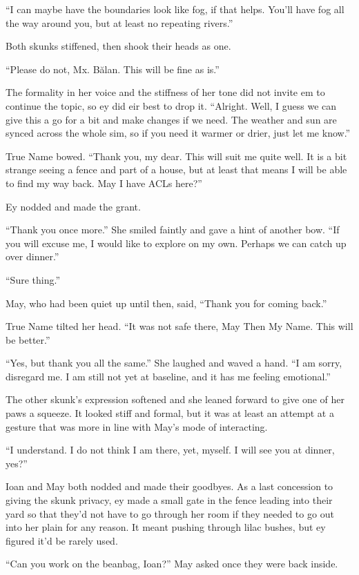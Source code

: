 ``I can maybe have the boundaries look like fog, if that helps. You'll have fog all the way around you, but at least no repeating rivers.''

Both skunks stiffened, then shook their heads as one.

``Please do not, Mx. Bălan. This will be fine as is.''

The formality in her voice and the stiffness of her tone did not invite em to continue the topic, so ey did eir best to drop it. ``Alright. Well, I guess we can give this a go for a bit and make changes if we need. The weather and sun are synced across the whole sim, so if you need it warmer or drier, just let me know.''

True Name bowed. ``Thank you, my dear. This will suit me quite well. It is a bit strange seeing a fence and part of a house, but at least that means I will be able to find my way back. May I have ACLs here?''

Ey nodded and made the grant.

``Thank you once more.'' She smiled faintly and gave a hint of another bow. ``If you will excuse me, I would like to explore on my own. Perhaps we can catch up over dinner.''

``Sure thing.''

May, who had been quiet up until then, said, ``Thank you for coming back.''

True Name tilted her head. ``It was not safe there, May Then My Name. This will be better.''

``Yes, but thank you all the same.'' She laughed and waved a hand. ``I am sorry, disregard me. I am still not yet at baseline, and it has me feeling emotional.''

The other skunk's expression softened and she leaned forward to give one of her paws a squeeze. It looked stiff and formal, but it was at least an attempt at a gesture that was more in line with May's mode of interacting.

``I understand. I do not think I am there, yet, myself. I will see you at dinner, yes?''

Ioan and May both nodded and made their goodbyes. As a last concession to giving the skunk privacy, ey made a small gate in the fence leading into their yard so that they'd not have to go through her room if they needed to go out into her plain for any reason. It meant pushing through lilac bushes, but ey figured it'd be rarely used.

``Can you work on the beanbag, Ioan?'' May asked once they were back inside.

